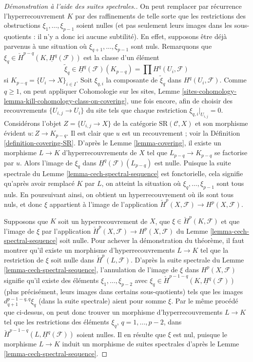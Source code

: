 \begin{proof}[Démonstration à l'aide des suites spectrales.]
\medskip\noindent
On peut remplacer par récurrence l'hyperrecouvrement $K$ par des raffinements
de telle sorte que les restrictions des obstructions $\xi_1, \ldots, \xi_{p - 1}$ soient nulles
(et pas seulement leurs images
dans les sous-quotients : il n'y a donc ici aucune subtilité). En effet, supposons être
déjà parvenus à une situation où
$\xi_{q + 1}, \ldots, \xi_{p - 1}$ sont nuls.
Remarquons que $\xi_q \in \check{H}^{p - q}(K, \underline{H}^q(\mathcal{F}))$
est la classe d'un élément
$$
\tilde \xi_q \in
\underline{H}^q(\mathcal{F})(K_{p - q}) =
\prod H^q(U_i, \mathcal{F})
$$
si $K_{p - q} = \{U_i \to X\}_{i \in I}$. Soit $\xi_{q, i}$
la composante de $\tilde \xi_q$ dans $H^q(U_i, \mathcal{F})$.
Comme $q \geq 1$, on peut appliquer
Cohomologie sur les sites,
Lemme \ref{sites-cohomology-lemma-kill-cohomology-class-on-covering},
une fois encore, afin de choisir des recouvrements $\{U_{i, j} \to U_i\}$
du site tels que chaque restriction $\xi_{q, i}|_{U_{i, j}} = 0$.
Considérons l'objet $Z = \{U_{i, j} \to X\}$ de la catégorie
$\text{SR}(\mathcal{C}, X)$ et son morphisme évident
$u : Z \to K_{p - q}$. Il est clair que $u$ est un recouvrement ; voir
la Définition \ref{definition-covering-SR}. D'après le
Lemme \ref{lemma-covering}, il
existe un morphisme $L \to K$ d'hyperrecouvrements de $X$ tel que
$L_{p - q} \to K_{p - q}$ se factorise par $u$. Alors l'image de
$\xi_q$ dans $\underline{H}^q(\mathcal{F})(L_{p - q})$
est nulle. Puisque la suite spectrale du
Lemme \ref{lemma-cech-spectral-sequence}
est fonctorielle, cela signifie qu'après avoir remplacé $K$ par $L$, on atteint la
situation où $\xi_q, \ldots, \xi_{p - 1}$ sont tous nuls.
En poursuivant ainsi, on obtient un hyperrecouvrement où ils sont tous
nuls, et donc $\xi$ appartient à l'image de l'application
$\check{H}^p(X, \mathcal{F}) \to H^p(X, \mathcal{F})$.

\medskip\noindent
Supposons que $K$ soit un hyperrecouvrement de $X$, que
$\xi \in \check{H}^p(K, \mathcal{F})$ et que l'image de
$\xi$ par l'application
$\check{H}^p(X, \mathcal{F}) \to H^p(X, \mathcal{F})$ du
Lemme \ref{lemma-cech-spectral-sequence}
soit nulle. Pour achever la démonstration du théorème, il faut montrer qu'il
existe un morphisme d'hyperrecouvrements $L \to K$ tel que
la restriction de $\xi$ soit nulle dans $\check{H}^p(L, \mathcal{F})$.
D'après la suite spectrale du Lemme \ref{lemma-cech-spectral-sequence},
l'annulation de l'image de $\xi$ dans $H^p(X, \mathcal{F})$
signifie qu'il existe des éléments $\xi_1, \ldots, \xi_{p - 2}$
avec $\xi_q \in \check{H}^{p - 1 - q}(K, \underline{H}^q(\mathcal{F}))$
(plus précisément, leurs images dans certains sous-quotients)
tels que les images $d_{q + 1}^{p - 1 - q, q}\xi_q$ (dans la suite
spectrale) aient pour somme $\xi$. Par le même procédé que ci-dessus,
on peut donc trouver un morphisme d'hyperrecouvrements $L \to K$ tel que
les restrictions des éléments $\xi_q$, $q = 1, \ldots, p - 2$,
dans $\check{H}^{p - 1 - q}(L, \underline{H}^q(\mathcal{F}))$ soient nulles.
Il en résulte que $\xi$ est nul, puisque le morphisme $L \to K$
induit un morphisme de suites spectrales d'après le
Lemme \ref{lemma-cech-spectral-sequence}.
\end{proof}

